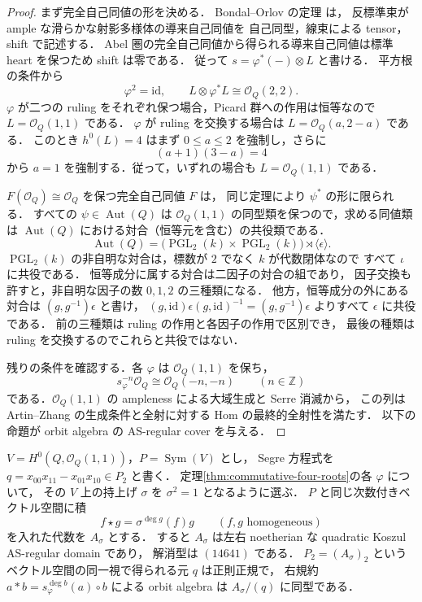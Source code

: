 \begin{proof}
まず完全自己同値の形を決める．
Bondal--Orlov の定理 \cite[Theorem~3.1]{BondalOrlov2001} は，
反標準束が ample な滑らかな射影多様体の導来自己同値を
自己同型，線束による tensor，shift で記述する．
Abel 圏の完全自己同値から得られる導来自己同値は標準 heart を保つため shift は零である．
従って $s=\varphi^*(-)\otimes L$ と書ける．
平方根の条件から
\[
 \varphi^2=\mathrm{id},\qquad
 L\otimes\varphi^*L\cong\mathcal O_Q(2,2).
\]
$\varphi$ が二つの ruling をそれぞれ保つ場合，Picard 群への作用は恒等なので
$L=\mathcal O_Q(1,1)$ である．
$\varphi$ が ruling を交換する場合は
$L=\mathcal O_Q(a,2-a)$ である．
このとき $h^0(L)=4$ はまず $0\le a\le2$ を強制し，さらに
\[
 (a+1)(3-a)=4
\]
から $a=1$ を強制する．従って，いずれの場合も $L=\mathcal O_Q(1,1)$ である．

$F(\mathcal O_Q)\cong\mathcal O_Q$ を保つ完全自己同値 $F$ は，
同じ定理により $\psi^*$ の形に限られる．
すべての $\psi\in\operatorname{Aut}(Q)$ は
$\mathcal O_Q(1,1)$ の同型類を保つので，求める同値類は
$\operatorname{Aut}(Q)$ における対合（恒等元を含む）の共役類である．
\[
 \operatorname{Aut}(Q)
 =\bigl(\operatorname{PGL}_2(k)\times\operatorname{PGL}_2(k)\bigr)
       \rtimes\langle\epsilon\rangle.
\]
$\operatorname{PGL}_2(k)$ の非自明な対合は，標数が $2$ でなく $k$ が代数閉体なので
すべて $\iota$ に共役である．
恒等成分に属する対合は二因子の対合の組であり，
因子交換も許すと，非自明な因子の数 $0,1,2$ の三種類になる．
他方，恒等成分の外にある対合は $(g,g^{-1})\epsilon$ と書け，
$(g,\mathrm{id})\epsilon(g,\mathrm{id})^{-1}=(g,g^{-1})\epsilon$
よりすべて $\epsilon$ に共役である．
前の三種類は ruling の作用と各因子の作用で区別でき，
最後の種類は ruling を交換するのでこれらと共役ではない．

残りの条件を確認する．各 $\varphi$ は $\mathcal O_Q(1,1)$ を保ち，
\[
 s_\varphi^{-n}\mathcal O_Q\cong\mathcal O_Q(-n,-n)
 \qquad(n\in\mathbb Z)
\]
である．$\mathcal O_Q(1,1)$ の ampleness による大域生成と Serre 消滅から，
この列は Artin--Zhang の生成条件と全射に対する Hom の最終的全射性を満たす．
以下の命題が orbit algebra の AS-regular cover を与える．
\end{proof}

\begin{proposition}
\label{prop:commutative-twist-covers}
$V=H^0(Q,\mathcal O_Q(1,1))$，$P=\operatorname{Sym}(V)$ とし，
Segre 方程式を
$q=x_{00}x_{11}-x_{01}x_{10}\in P_2$ と書く．
定理\ref{thm:commutative-four-roots}の各 $\varphi$ について，
その $V$ 上の持上げ $\sigma$ を $\sigma^2=1$ となるように選ぶ．
$P$ と同じ次数付きベクトル空間に積
\[
 f\star g=\sigma^{\deg g}(f)g
 \qquad(f,g\text{ homogeneous})
\]
を入れた代数を $A_\sigma$ とする．
すると $A_\sigma$ は左右 noetherian な quadratic Koszul AS-regular domain であり，
解消型は $(14641)$ である．
$P_2=(A_\sigma)_2$ というベクトル空間の同一視で得られる元 $q$ は正則正規で，
右規約
$a*b=s_\varphi^{\deg b}(a)\circ b$
による orbit algebra は $A_\sigma/(q)$ に同型である．
\end{proposition}

